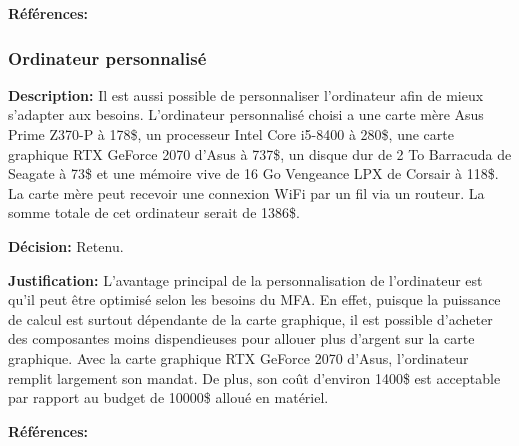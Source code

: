 \textbf{Références:} \cite{AMD_RX} \cite{HP_hardware}


\subsubsection{Ordinateur personnalisé}

\textbf{Description:} Il est aussi possible de personnaliser l'ordinateur afin de mieux s'adapter aux besoins. L'ordinateur personnalisé choisi a une carte mère Asus Prime Z370-P à 178\$, un processeur Intel Core i5-8400 à 280\$, une carte graphique RTX GeForce 2070 d'Asus à 737\$, un disque dur de 2 To Barracuda de Seagate à 73\$ et une mémoire vive de 16 Go Vengeance LPX de Corsair à 118\$. La carte mère peut recevoir une connexion WiFi par un fil via un routeur. La somme totale de cet ordinateur serait de 1386\$.

\textbf{Décision:} Retenu.

\textbf{Justification:} L'avantage principal de la personnalisation de l'ordinateur est qu'il peut être optimisé selon les besoins du MFA. En effet, puisque la puissance de calcul est surtout dépendante de la carte graphique, il est possible d'acheter des composantes moins dispendieuses pour allouer plus d'argent sur la carte graphique. Avec la carte graphique RTX GeForce 2070 d'Asus, l'ordinateur remplit largement son mandat. De plus, son coût d'environ 1400\$ est acceptable par rapport au budget de 10000\$ alloué en matériel.

\textbf{Références:} \cite{Custom_R7} \cite{Amazon_RTX} \cite{Amazon_i5}

\begin{table}[!htb]
\footnotesize
\centering
{}
\caption{Faisabilité des concepts pour la compilation des données}
\label{t:Decision_compilation}
\end{table}


